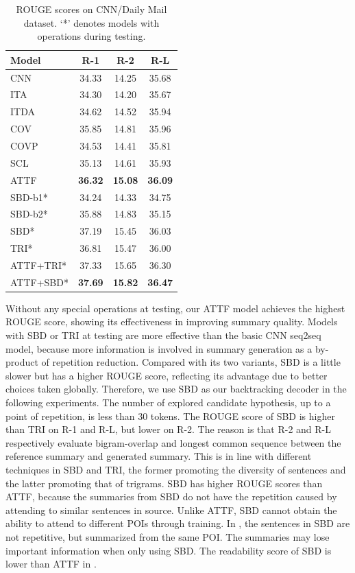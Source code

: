\begin{table}[th]
	\centering
	\scriptsize
	\begin{tabular}{|l|c|c|c|}
		\hline
		Model &   R-1 & R-2 & R-L \\
		\hline
		CNN &  34.33 & 14.25 & 35.68 \\
		ITA &  34.30 & 14.20 & 35.67 \\
		ITDA & 34.62 & 14.52 &  35.94 \\
	    COV	& 35.85 & 14.81 &  35.96 \\
	    COVP & 34.53 & 14.41 &  35.81 \\
	    SCL	& 35.13 & 14.61 & 35.93 \\
		ATTF & \bf 36.32 & \bf 15.08 & \bf 36.09 \\
		\hline
		SBD-b1* & 34.24 & 14.33 & 34.75 \\
		SBD-b2* & 35.88 & 14.83 & 35.15 \\
		SBD* & 37.19 & 15.45 & 36.03 \\
        TRI* & 36.81 & 15.47 & 36.00 \\
		ATTF+TRI* & 37.33 & 15.65 & 36.30 \\
		ATTF+SBD* & \bf 37.69 & \bf 15.82 & \bf 36.47 \\
		\hline
	\end{tabular}
	\caption{ROUGE scores on CNN/Daily Mail dataset. `*' denotes 
models with operations during testing.}
	\label{tab:eval_main}
\end{table}

Without any special operations at testing, 
our ATTF model achieves the highest ROUGE score, showing
its effectiveness in improving summary quality.
Models with SBD or TRI at testing
are more effective than the basic CNN seq2seq model,
because more information is involved in summary generation 
as a by-product of repetition reduction.
Compared with its two variants, SBD is a little slower 
but has a higher ROUGE score, reflecting its advantage due to
better choices taken globally.
Therefore, 
we use SBD as our backtracking decoder in the following experiments. 
The number of explored candidate hypothesis, up to a point of
repetition, is less than 30 tokens.
The ROUGE score of SBD is higher than TRI on R-1 and R-L, but lower on R-2. 
The reason is that R-2 and R-L respectively evaluate
bigram-overlap and longest common sequence between the reference
summary and generated summary. This is in line with different techniques 
in SBD and TRI, the former promoting the diversity of sentences and 
the latter promoting that of trigrams.
SBD has higher ROUGE scores than ATTF, 
because the summaries from
SBD do not have the repetition caused by attending to similar sentences in source.
Unlike ATTF, 
SBD cannot obtain the ability to attend to different POIs through training.
In , the sentences in SBD are not repetitive, 
but summarized from the same POI.
The summaries may lose important information when only using SBD.
The readability score of SBD is lower than ATTF in .

